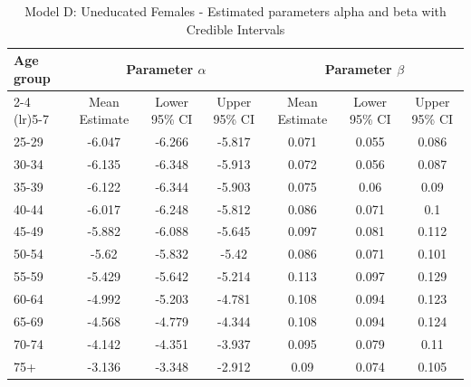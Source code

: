 \begin{landscape}
\begin{table}[htbp]
\centering
\caption{Model D: Uneducated Females - Estimated parameters alpha and beta  with Credible Intervals}
\label{tab:parameters_ab25}
\begin{tabular}{@{}lcccccc@{}}
\toprule
Age group & \multicolumn{3}{c}{Parameter \(\alpha\)} & \multicolumn{3}{c}{Parameter \(\beta\)} \\ 
\cmidrule(lr){2-4} \cmidrule(lr){5-7}
          & Mean Estimate & Lower 95\% CI & Upper 95\% CI & Mean Estimate & Lower 95\% CI & Upper 95\% CI \\ 
\midrule
25-29 & -6.047 & -6.266 & -5.817 & 0.071 & 0.055 & 0.086 \\
30-34 & -6.135 & -6.348 & -5.913 & 0.072 & 0.056 & 0.087 \\
35-39 & -6.122 & -6.344 & -5.903 & 0.075 & 0.06 & 0.09 \\
40-44 & -6.017 & -6.248 & -5.812 & 0.086 & 0.071 & 0.1 \\
45-49 & -5.882 & -6.088 & -5.645 & 0.097 & 0.081 & 0.112 \\
50-54 & -5.62 & -5.832 & -5.42 & 0.086 & 0.071 & 0.101 \\
55-59 & -5.429 & -5.642 & -5.214 & 0.113 & 0.097 & 0.129 \\
60-64 & -4.992 & -5.203 & -4.781 & 0.108 & 0.094 & 0.123 \\
65-69 & -4.568 & -4.779 & -4.344 & 0.108 & 0.094 & 0.124 \\
70-74 & -4.142 & -4.351 & -3.937 & 0.095 & 0.079 & 0.11 \\
75+ & -3.136 & -3.348 & -2.912 & 0.09 & 0.074 & 0.105 \\
\bottomrule
\end{tabular}
\end{table}
\end{landscape}